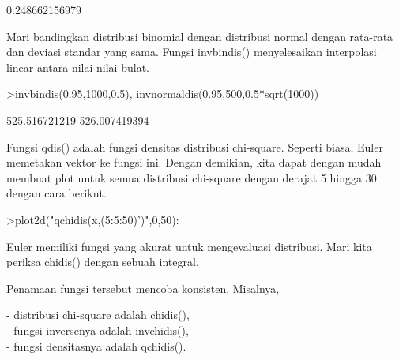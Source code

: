 \documentclass[12pt,arial,letterpaper]{book}
\begin{document}
\begin{eulercomment}
\begin{eulercomment}
\begin{eulercomment}
\begin{eulercomment}
\begin{eulercomment}
\begin{eulercomment}
\begin{eulercomment}
\begin{eulercomment}
\begin{eulercomment}
\begin{eulercomment}
\begin{eulercomment}
\begin{eulercomment}
\begin{eulercomment}
\begin{eulercomment}
\begin{eulercomment}
\begin{eulercomment}
\begin{eulercomment}
\begin{eulercomment}
\begin{eulercomment}
\begin{eulercomment}
\begin{eulercomment}
\begin{eulercomment}
\begin{eulercomment}
\begin{eulercomment}
\begin{eulercomment}
\begin{eulercomment}
\begin{eulercomment}
\begin{eulercomment}
\begin{eulercomment}
\begin{eulercomment}
\begin{eulercomment}
\begin{eulercomment}
\begin{eulerprompt}
\end{eulerprompt}
\begin{euleroutput}
  0.248662156979
\end{euleroutput}
\begin{eulercomment}
Mari bandingkan distribusi binomial dengan distribusi normal dengan
rata-rata dan deviasi standar yang sama. Fungsi invbindis()
menyelesaikan interpolasi linear antara nilai-nilai bulat.
\end{eulercomment}
\begin{eulerprompt}
>invbindis(0.95,1000,0.5), invnormaldis(0.95,500,0.5*sqrt(1000))
\end{eulerprompt}
\begin{euleroutput}
  525.516721219
  526.007419394
\end{euleroutput}
\begin{eulercomment}
Fungsi qdis() adalah fungsi densitas distribusi chi-square. Seperti
biasa, Euler memetakan vektor ke fungsi ini. Dengan demikian, kita
dapat dengan mudah membuat plot untuk semua distribusi chi-square
dengan derajat 5 hingga 30 dengan cara berikut.
\end{eulercomment}
\begin{eulerprompt}
>plot2d("qchidis(x,(5:5:50)')",0,50):
\end{eulerprompt}
\begin{eulercomment}
Euler memiliki fungsi yang akurat untuk mengevaluasi distribusi. Mari
kita periksa chidis() dengan sebuah integral.

Penamaan fungsi tersebut mencoba konsisten. Misalnya,

- distribusi chi-square adalah chidis(),\\
- fungsi inversenya adalah invchidis(),\\
- fungsi densitasnya adalah qchidis().


\end{eulercomment}
\end{eulercomment}
\end{eulercomment}
\end{eulercomment}
\end{eulercomment}
\end{eulercomment}
\end{eulercomment}
\end{eulercomment}
\end{eulercomment}
\end{eulercomment}
\end{eulercomment}
\end{eulercomment}
\end{eulercomment}
\end{eulercomment}
\end{eulercomment}
\end{eulercomment}
\end{eulercomment}
\end{eulercomment}
\end{eulercomment}
\end{eulercomment}
\end{eulercomment}
\end{eulercomment}
\end{eulercomment}
\end{eulercomment}
\end{eulercomment}
\end{eulercomment}
\end{eulercomment}
\end{eulercomment}
\end{eulercomment}
\end{eulercomment}
\end{eulercomment}
\end{eulercomment}
\end{eulercomment}
\end{document}
